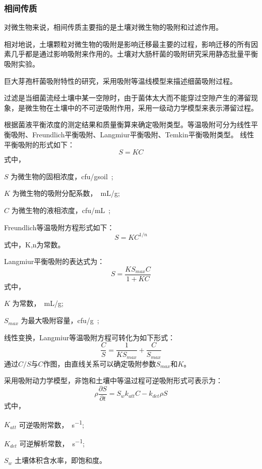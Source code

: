 \subsubsection{相间传质}
对微生物来说，相间传质主要指的是土壤对微生物的吸附和过滤作用。\par
相对地说，土壤颗粒对微生物的吸附是影响迁移最主要的过程，影响迁移的所有因素几乎都是通过影响吸附来作用的。土壤对大肠杆菌的吸附研究采用静态批量平衡吸附实验。\par
巨大芽孢杆菌吸附特性的研究，采用吸附等温线模型来描述细菌吸附过程。\par
过滤是当细菌流经土壤中某一空隙时，由于菌体太大而不能穿过空隙产生的滞留现象，是微生物在土壤中的不可逆吸附作用，采用一级动力学模型来表示滞留过程。\par
根据菌液平衡浓度的测定结果和质量衡算来确定吸附类型。等温吸附可分为线性平衡吸附、Freundlich平衡吸附、Langmiur平衡吸附、Temkin平衡吸附类型。
线性平衡吸附的形式如下：
\begin{equation}
S=KC
\end{equation}
式中，
\begin{paralist}
	\item[$S$]为微生物的固相浓度，\SI{cfu/gsoil};
	\item[$K$]为微生物的吸附分配系数，\SI{}{mL/g};
	\item[$C$]为微生物的液相浓度，\SI{cfu/mL};
\end{paralist}
Freundlich等温吸附方程形式如下：
\begin{equation}
S=KC^{1/n}
\end{equation}
式中，K,n为常数。\par
Langmiur平衡吸附的表达式为：
\begin{equation}
S=\dfrac{KS_{max}C}{1+KC}
\end{equation}
式中，
\begin{paralist}
	\item[$K$]为常数，\SI{}{mL/g};
	\item[$S_{max}$]为最大吸附容量，\SI{cfu/g};
\end{paralist}
线性变换，Langmiur等温吸附方程可转化为如下形式：
\begin{equation}
\dfrac{C}{S}=\dfrac{1}{KS_{max}}+\dfrac{C}{S_{max}}
\end{equation}
通过$C/S$与$C$作图，由直线关系可以确定吸附参数$S_{max}$和$K$。\par
采用吸附动力学模型，非饱和土壤中等温过程可逆吸附形式可表示为：
\begin{equation}
\rho\dfrac{\partial S}{\partial t}=S_wk_{att}C-k_{det}\rho S
\end{equation}
式中，
\begin{paralist}
	\item[$K_{att}$]可逆吸附常数，\SI{}{s^{-1}};
	\item[$K_{det}$]可逆解析常数，\SI{}{s^{-1}};
	\item[$S_w$]土壤体积含水率，即饱和度。
\end{paralist}
